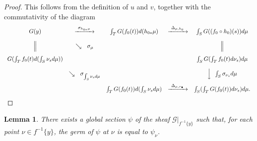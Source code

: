 \documentclass[11pt]{article}
\theoremstyle{plain}
\newtheorem{lemma}{Lemma}
\theoremstyle{definition}
\begin{document}

\begin{proof}
This follows from the definition of $u$ and $v$, together with the commutativity of the diagram
\[
\begin{array}{ccccc}
G(y) & \xrightarrow{\ \sigma_{h_{0*}\mu}\ } & \int_T G(f_0(t))d(h_{0*}\mu) & \xrightarrow{\ \Delta_{\mu,h_0}\ } & \int_S G((f_0 \circ h_0)(s))d\mu\\[10pt]
\Big\Vert & \searrow{\ \ \sigma_\mu} & & & \Big\Vert\\[10pt]
G(\int_T f_0(t)d(\int_S \nu_s d\mu)) & & & & \int_S G(\int_T f_0(t)d\nu_s)d\mu\\[10pt]
& \searrow{\ \ \sigma_{\int_S \nu_s d\mu}} & & & \Big\downarrow{\ \ \int_S \sigma_{\nu_s}d\mu}\\[10pt]
& & \int_T G(f_0(t))d(\int_S \nu_s d\mu) & \xrightarrow{\ \Delta_{\mu,\nu_\bullet}\ } & \int_S (\int_T G(f_0(t))d\nu_s)d\mu.
\end{array}
\]
\end{proof}

\renewcommand{\thelemma}{3.5.5}
\begin{lemma}
There exists a global section $\psi$ of the sheaf $\mathscr{G}|_{f^{-1}\{y\}}$ such that, for each point $\nu \in f^{-1}\{y\}$, the germ of $\psi$ at $\nu$ is equal to $\psi_\nu$.
\end{lemma}
\end{document}
